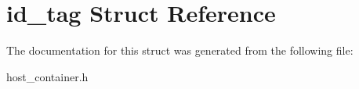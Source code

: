 \hypertarget{structid__tag}{}\section{id\+\_\+tag Struct Reference}
\label{structid__tag}


The documentation for this struct was generated from the following file\+:\begin{DoxyCompactItemize}
\item 
host\+\_\+container.\+h\end{DoxyCompactItemize}
